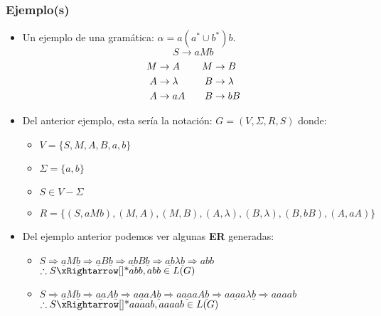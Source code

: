 \subsubsection{Ejemplo(s)}
\begin{itemize}
\item Un ejemplo de una gramática: $\alpha = a(a^* \cup b^* ) b$.
$$
S \rightarrow aMb
$$
\begin{align*}
M &\rightarrow A & \hspace{0.25cm} M&\rightarrow B \\
A &\rightarrow \lambda & \hspace{0.25cm} B&\rightarrow \lambda \\
A &\rightarrow aA & \hspace{0.25cm}  B&\rightarrow bB \\
\end{align*}
\item Del anterior ejemplo, esta sería la notación: $G=(V,\Sigma,R,S)$ donde:
\begin{itemize}
\item $V=\{ S,M,A,B,a,b \}$
\item $\Sigma =\{ a,b \}$ 
\item $S\in V-\Sigma$
\item $R = \{ (S,aMb),(M,A),(M,B),(A,\lambda),(B,\lambda),(B,bB),(A,aA) \}$
\end{itemize}
\item Del ejemplo anterior podemos ver algunas \textbf{ER} generadas:
\begin{itemize}
\item $S \Rightarrow  \underline{a}M\underline{b} 
	   \Rightarrow  \underline{a}B\underline{b} 
	   \Rightarrow  \underline{ab}B\underline{b} 
	   \Rightarrow  \underline{ab}\lambda\underline{b} 
	   \Rightarrow  abb
	$
	\\${ }$\\
	$ \therefore S \xRightarrow[\text{}]{\text{*}} abb , abb\in L(G) $
\item $S \Rightarrow  \underline{a}M\underline{b} 
	   \Rightarrow  \underline{aa}A\underline{b} 
	   \Rightarrow  \underline{aaa}A\underline{b} 
	   \Rightarrow  \underline{aaaa}A\underline{b} 
	   \Rightarrow  \underline{aaaa}\lambda\underline{b} 
	   \Rightarrow  aaaab
	$
	\\${ }$\\
	$ \therefore S \xRightarrow[\text{}]{\text{*}} aaaab , aaaab\in L(G) $
\end{itemize}
\end{itemize}
